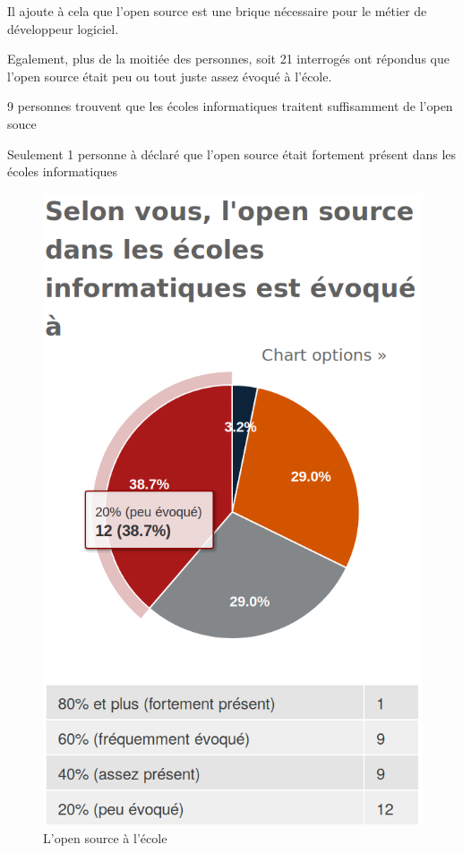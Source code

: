 			Il ajoute à cela que l'open source est une brique nécessaire pour le métier de développeur logiciel.

			\begin{center}
				\textit{
				}
			\end{center}

			Egalement, plus de la moitiée des personnes, soit 21 interrogés ont répondus que l'open source était peu ou tout juste assez évoqué à l'école.

			9 personnes trouvent que les écoles informatiques traitent suffisamment de l'open souce

			Seulement 1 personne à déclaré que l'open source était fortement présent dans les écoles informatiques

			\begin{figure}[!htb]
				\center
				\includegraphics[scale=0.28]{./img/a5}
				\caption{L'open source à l'école}					
			\end{figure}

